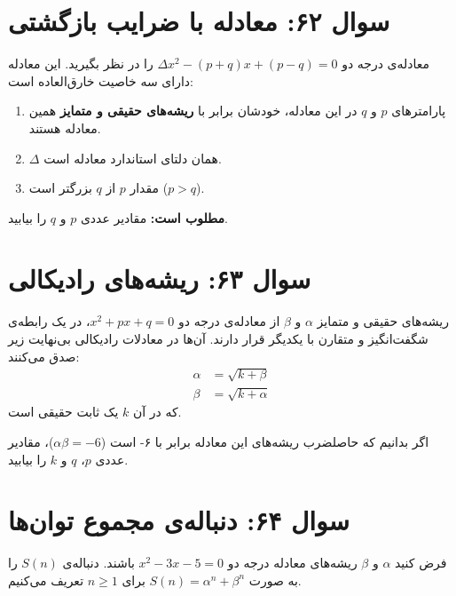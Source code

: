 \documentclass[12pt]{article}
\begin{document}
	\section*{سوال ۶۲: معادله با ضرایب بازگشتی}
	معادله‌ی درجه دو \( \Delta x^2 - (p+q)x + (p-q) = 0 \) را در نظر بگیرید. این معادله دارای سه خاصیت خارق‌العاده است:
	\begin{enumerate}[label=(\roman*)]
		\item پارامترهای \(p\) و \(q\) در این معادله، خودشان برابر با \textbf{ریشه‌های حقیقی و متمایز} همین معادله هستند.
		\item \( \Delta \) همان دلتای استاندارد معادله است.
		\item مقدار \(p\) از \(q\) بزرگتر است (\(p > q\)).
	\end{enumerate}
	\vspace{0.5cm}
	
	\textbf{مطلوب است:} مقادیر عددی \(p\) و \(q\) را بیابید.
	
	\vspace{1cm}
	\hrulefill
	\vspace{1cm}
	
	\section*{سوال ۶۳: ریشه‌های رادیکالی}
	ریشه‌های حقیقی و متمایز \(\alpha\) و \(\beta\) از معادله‌ی درجه دو \( x^2 + px + q = 0 \)، در یک رابطه‌ی شگفت‌انگیز و متقارن با یکدیگر قرار دارند. آن‌ها در معادلات رادیکالی بی‌نهایت زیر صدق می‌کنند:
	\begin{align*}
		\alpha &= \sqrt{k + \beta} \\
		\beta &= \sqrt{k + \alpha}
	\end{align*}
	که در آن \(k\) یک ثابت حقیقی است.
	\vspace{0.5cm}
	
	اگر بدانیم که حاصلضرب ریشه‌های این معادله برابر با ۶- است (\(\alpha\beta = -6\))، مقادیر عددی \(p\)، \(q\) و \(k\) را بیابید.
	
	\vspace{1cm}
	\hrulefill
	\vspace{1cm}
	
	\section*{سوال ۶۴: دنباله‌ی مجموع توان‌ها}
	فرض کنید \(\alpha\) و \(\beta\) ریشه‌های معادله درجه دو \( x^2 - 3x - 5 = 0 \) باشند.
	دنباله‌ی \(S(n)\) را به صورت \( S(n) = \alpha^n + \beta^n \) برای \( n \ge 1 \) تعریف می‌کنیم.
	\vspace{0.5cm}
	
\end{document}
